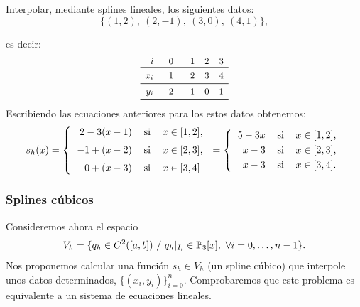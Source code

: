  \begin{example}
   \label{ex:splines-lineales-1}
   Interpolar, mediante splines lineales, los siguientes
   datos:
   \begin{equation*}
     \{ (1,2),\ (2,-1),\ (3,0),\ (4,1) \},
   \end{equation*}
 \end{example}
 es decir:
 \begin{equation}
   \small
   \begin{array}{r@{\rule{4ex}{0pt}}rrrcr}
     i & 0 & 1 & 2 & 3 
     \\ \toprule %
     x_i & 1 & 2 & 3 & 4
     \\ \midrule
     y_i & 2 & -1 & 0  & 1
     \\
     \bottomrule
   \end{array}
   \label{eq:tabla-datos-lagrange-splines}
 \end{equation}
 Escribiendo las ecuaciones anteriores para los
 estos datos obtenemos:
 \begin{equation*}
   s_h(x)=\left\{
     \begin{tabular}{rll}
       $2 -3 (x-1)$ & si & $x\in[1,2]$,
       \\\noalign{\medskip}
       $-1 + (x-2)$ & si & $x\in[2,3]$,
       \\\noalign{\medskip}
       $0 + (x-3)$ & si & $x\in[3,4]$
     \end{tabular} \right.
   =\left\{
     \begin{tabular}{rll}
       $5 -3x$ & si & $x\in[1,2]$,
       \\\noalign{\smallskip}
       $x-3$ & si & $x\in[2,3]$,
       \\\noalign{\smallskip}
       $x-3$ & si & $x\in[3,4]$.
     \end{tabular} \right.
 \end{equation*}

 \subsubsection{Splines cúbicos}
 \label{sec:splines-lineales}

 Consideremos ahora el espacio
 \begin{equation*} V_h = \{q_h \in C^{2}([a,b])\ / \ q_h|_{I_i}\in
   \operatorname{{\mathbb P}}_3[x],\ \forall i=0,\dots,n-1\}.
 \end{equation*} Nos proponemos calcular una función $s_h\in V_h$ (un
 spline cúbico) que interpole unos datos determinados,
 $\{(x_i,y_i)\}_{i=0}^n$. Comprobaremos que este problema es
 equivalente a un sistema de ecuaciones lineales.

